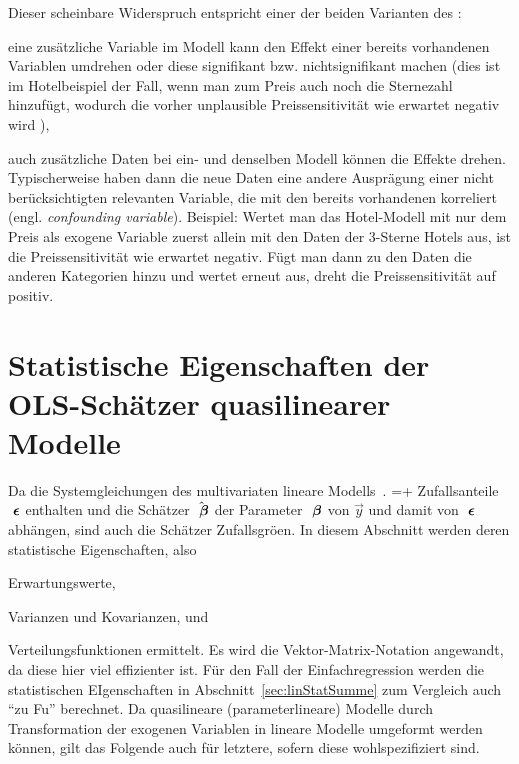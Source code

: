 
Dieser scheinbare Widerspruch entspricht einer der beiden Varianten des
:
\bi
\item eine zus\"atzliche
Variable im Modell kann den Effekt einer bereits vorhandenen Variablen umdrehen oder
diese signifikant bzw. nichtsignifikant machen (dies ist im
Hotelbeispiel der Fall, wenn man zum Preis auch noch die
Sternezahl hinzuf\"ugt, wodurch die vorher unplausible Preissensitivit\"at wie erwartet
negativ wird ),
\item auch
  zus\"atzliche Daten bei ein- und denselben Modell k\"onnen die Effekte drehen.
  Typischerweise haben dann die neue Daten eine
  andere Auspr\"agung einer nicht ber\"ucksichtigten relevanten
  Variable, die mit den bereits vorhandenen korreliert
  (engl. \emph{confounding variable}). Beispiel: Wertet man
  das Hotel-Modell mit nur dem Preis als exogene Variable zuerst allein
  mit den Daten der 3-Sterne Hotels aus, ist die Preissensitivit\"at
  wie erwartet negativ. F\"ugt man dann zu den Daten die anderen
  Kategorien hinzu und wertet erneut aus, dreht die Preissensitivit\"at
  auf positiv.
\ei


\section{\label{sec:linStat}Statistische 
Eigenschaften der OLS-Sch\"atzer quasilinearer Modelle}

Da die Systemgleichungen des multivariaten lineare
Modells~.
\bdm
{}=\vecbeta+\veceps
\edm
Zufallsanteile ${\mbox{ \boldmath{$\epsilon$}}}$ enthalten und die Sch\"atzer $\hat{{\mbox{ \boldmath{$\beta$}}}}$
der Parameter ${\mbox{ \boldmath{$\beta$}}}$ von $\vec{y}$ und damit von ${\mbox{ \boldmath{$\epsilon$}}}$ abh\"angen, sind auch die Sch\"atzer Zufallsgr\"o\3en. In
diesem Abschnitt werden deren statistische Eigenschaften, also 
\bi
\item Erwartungswerte,
\item Varianzen und Kovarianzen, und
\item Verteilungsfunktionen
\ei
ermittelt. Es wird die Vektor-Matrix-Notation angewandt, da diese hier
viel effizienter ist. F\"ur den Fall der Einfachregression werden die
statistischen EIgenschaften in Abschnitt~\ref{sec:linStatSumme} zum
Vergleich auch ``zu Fu\3'' berechnet.
Da quasilineare (parameterlineare) Modelle durch Transformation der exogenen Variablen in
lineare Modelle umgeformt werden k\"onnen, gilt das Folgende auch
f\"ur letztere, sofern diese wohlspezifiziert sind.


